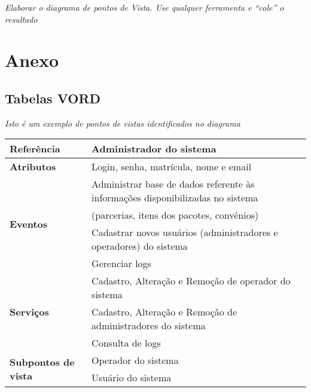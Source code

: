 \documentclass[12pt,a4paper]{article}
\begin{document}
\textit{Elaborar o diagrama de pontos de Vista.  Use qualquer ferramenta e “cole” o resultado}

\newpage

\section{Anexo}
\subsection{Tabelas VORD}

\textit{Isto é um exemplo de  pontos de vistas   identificados no diagrama}

\begin{table}[H]
\label{tab:VORD01}
\begin{small}
\begin{center}
    \begin{tabular}{ | l | l |}
    \hline
\textbf{Referência} & {Administrador do sistema}\\ \hline
\textbf{Atributos} & Login, senha, matrícula, nome e email \\\hline
\multirow{4}{*}{\textbf{Eventos}} & Administrar base de dados referente às informações disponibilizadas no sistema \\ & (parcerias, itens dos pacotes, convênios) \\ & Cadastrar novos usuários (administradores e operadores) do sistema \\ & Gerenciar logs\\\hline
\multirow{3}{*}{\textbf{Serviços}} & Cadastro, Alteração e Remoção de operador do sistema\\ & Cadastro, Alteração e Remoção de administradores do sistema\\& Consulta de logs\\\hline
\multirow{2}{*}{\textbf{Subpontos de vista}} & Operador do sistema \\ &
Usuário do sistema \\\hline
    \end{tabular}
\end{center}    
\end{small}
\end{table}
\end{document}
